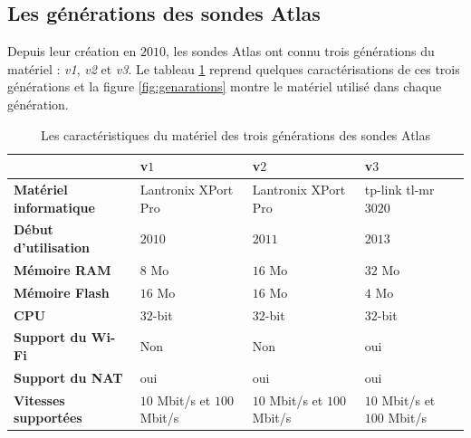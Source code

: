 \subsection{Les générations des sondes  Atlas }

Depuis leur création   en $2010$, les sondes Atlas ont connu   trois générations du matériel : \textit{v1}, \textit{v2} et \textit{v3}. Le tableau   \ref{tab:differents-generations-probes} reprend quelques  caractérisations de ces trois générations  et  la figure 	\ref{fig:genarations} montre le matériel utilisé  dans chaque génération.


\begin{table}[H]
	\begin{tabularx}{\textwidth}{|X|X|X|X|}
		\hline
		&\textbf{v$ 1 $}&\textbf{v$ 2 $}&\textbf{v$ 3 $} \\ \hline
		\textbf{Matériel informatique}  & Lantronix XPort Pro \cite{LantronixXPortPro} &Lantronix XPort Pro \cite{LantronixXPortPro}&tp-link tl-mr$ 3020  $  \\ \hline
		\textbf{Début d'utilisation}  &$2010$&$2011$&$2013$ \\ \hline
		\textbf{Mémoire RAM} & $8$ Mo&$16$ Mo& $32$ Mo\\ \hline
		\textbf{Mémoire Flash} & $16$ Mo&$16$ Mo&$4$ Mo \\ \hline
		\textbf{CPU} &$ 32 $-bit& $ 32 $-bit & $ 32 $-bit\\ \hline
		\textbf{Support du Wi-Fi} &Non&Non&oui \\ \hline
		\textbf{Support du NAT} &oui&oui&oui \\ \hline
		\textbf{Vitesses supportées} &$ 10 $ Mbit/s et $ 100 $ Mbit/s&$ 10 $ Mbit/s et $ 100 $ Mbit/s&$ 10 $ Mbit/s et $ 100 $ Mbit/s \\ \hline
		
	\end{tabularx}
	\caption{Les caractéristiques du matériel  des trois générations des sondes  Atlas }
	\label{tab:differents-generations-probes}
\end{table}


